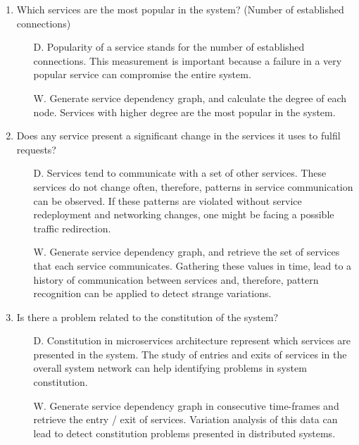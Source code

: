\begin{enumerate}
    \item Which services are the most popular in the system? (Number of established connections)
          \begin{itemize}
              \item[D.] Popularity of a service stands for the number of established connections. This measurement is important because a failure in a very popular service can compromise the entire system.
              \item[W.] Generate service dependency graph, and calculate the degree of each node. Services with higher degree are the most popular in the system.
          \end{itemize}

    \item Does any service present a significant change in the services it uses to fulfil requests?
          \begin{itemize}
              \item[D.] Services tend to communicate with a set of other services. These services do not change often, therefore, patterns in service communication can be observed. If these patterns are violated without service redeployment and networking changes, one might be facing a possible traffic redirection.
              \item[W.] Generate service dependency graph, and retrieve the set of services that each service communicates. Gathering these values in time, lead to a history of communication between services and, therefore, pattern recognition can be applied to detect strange variations.
          \end{itemize}

    \item Is there a problem related to the constitution of the system?
          \begin{itemize}
              \item[D.] Constitution in microservices architecture represent which services are presented in the system. The study of entries and exits of services in the overall system network can help identifying problems in system constitution.
              \item[W.] Generate service dependency graph in consecutive time-frames and retrieve the entry / exit of services. Variation analysis of this data can lead to detect constitution problems presented in distributed systems.
          \end{itemize}


\end{enumerate}
